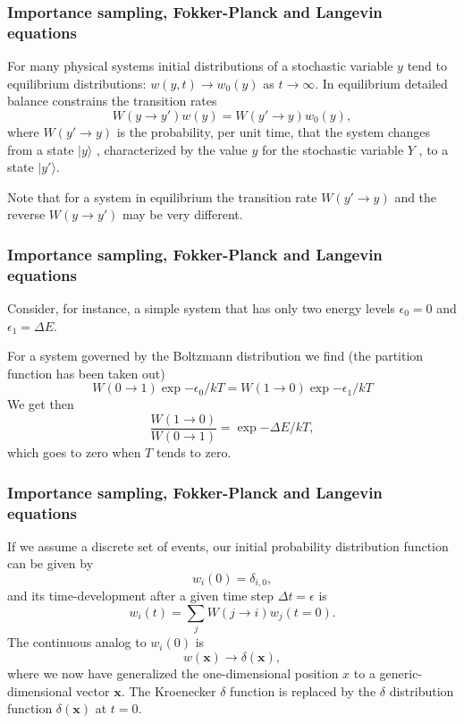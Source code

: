 \documentclass{beamer}
\begin{document}
\begin{frame}
\frametitle{Importance sampling, Fokker-Planck and Langevin equations}

\begin{block}{}
     For many physical systems initial distributions of a stochastic 
variable $y$ tend to equilibrium distributions: $w(y, t)\rightarrow w_0(y)$ 
as $t\rightarrow\infty$. In
equilibrium detailed balance constrains the transition rates
\[
     W(y\rightarrow y')w(y ) = W(y'\rightarrow y)w_0 (y),
\]
where $W(y'\rightarrow y)$ 
is the probability, per unit time, that the system changes
from a state $|y\rangle$ , characterized by the value $y$ 
for the stochastic variable $Y$ , to a state $|y'\rangle$.

Note that for a system in equilibrium the transition rate 
$W(y'\rightarrow y)$ and
the reverse $W(y\rightarrow y')$ may be very different. 
\end{block}
\end{frame}

\begin{frame}
\frametitle{Importance sampling, Fokker-Planck and Langevin equations}

\begin{block}{}
Consider, for instance, a simple
system that has only two energy levels $\epsilon_0 = 0$ and 
$\epsilon_1 = \Delta E$. 

For a system governed by the Boltzmann distribution we find (the partition function has been taken out)
\[
     W(0\rightarrow 1)\exp{-\epsilon_0/kT} = W(1\rightarrow 0)\exp{-\epsilon_1/kT}
\]
We get then
\[
     \frac{W(1\rightarrow 0)}{W(0 \rightarrow 1)}=\exp{-\Delta E/kT},
\]
which goes to zero when $T$ tends to zero.
\end{block}
\end{frame}

\begin{frame}
\frametitle{Importance sampling, Fokker-Planck and Langevin equations}

\begin{block}{}
If we assume a discrete set of events,
our initial probability
distribution function can be  given by 
\[
   w_i(0) = \delta_{i,0},
\]
and its time-development after a given time step $\Delta t=\epsilon$ is
\[ 
   w_i(t) = \sum_{j}W(j\rightarrow i)w_j(t=0).
\] 
The continuous analog to $w_i(0)$ is
\[
   w(\mathbf{x})\rightarrow \delta(\mathbf{x}),
\]
where we now have generalized the one-dimensional position $x$ to a generic-dimensional  
vector $\mathbf{x}$. The Kroenecker $\delta$ function is replaced by the $\delta$ distribution
function $\delta(\mathbf{x})$ at  $t=0$.  


\end{block}
\end{frame}
\end{document}
